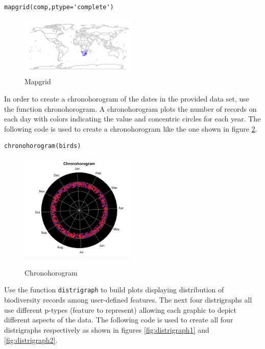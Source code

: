 \begin{lstlisting}[morekeywords={mapgrid}]
mapgrid(comp,ptype='complete')
\end{lstlisting}

\begin{figure}[htbp!]
   \centering
   \includegraphics[width=0.5\textwidth]{pictures/biodiversity/map.jpg} 
      \caption{Mapgrid}
   \label{fig:Mapgrid}
\end{figure} 

In order to create a chronohorogram of the dates in the provided data set, use the function chronohorogram.
A chronohorogram plots the number of records on each day with colors indicating the value and concentric circles for each year.
The following code is used to create a chronohorogram like the one shown in figure \ref{fig:chronohorogram}.

\begin{lstlisting}[morekeywords={chronohorogram}]
chronohorogram(birds)
\end{lstlisting}

\begin{figure}[htbp!] 
   \centering
      \caption{Chronohorogram}
   \includegraphics[width=0.5\textwidth]{pictures/biodiversity/chronohorogram.jpg} 
   \label{fig:chronohorogram}
\end{figure} 

Use the function \texttt{distrigraph} to build plots displaying distribution of biodiversity records among user-defined features.
The next four distrigraphs all use different p-types (feature to represent) allowing each graphic to depict different aspects of the data.
The following code is used to create all four distrigraphs respectively as shown in figures \ref{fig:distrigraph1} and \ref{fig:distrigraph2}.

